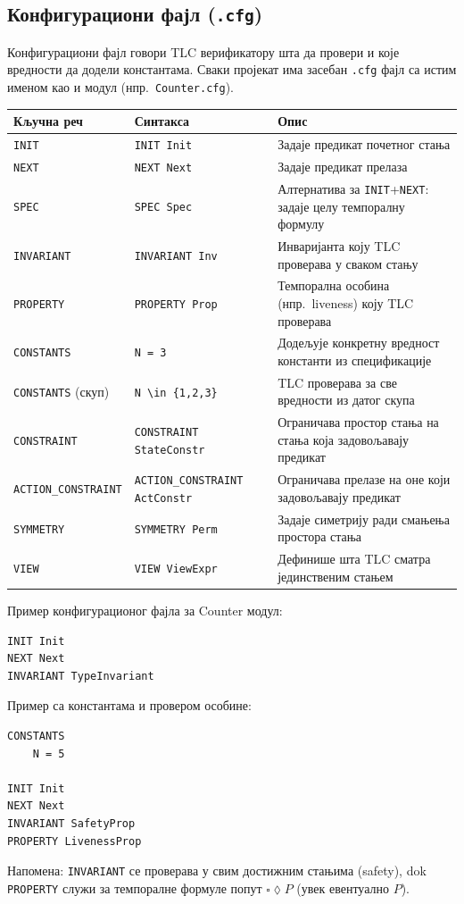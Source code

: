 \subsection{Конфигурациони фајл (\texttt{.cfg})}
Конфигурациони фајл говори TLC верификатору шта да провери и које вредности да додели константама.
Сваки пројекат има засебан \texttt{.cfg} фајл са истим именом као и модул (нпр.\ \texttt{Counter.cfg}).
\begin{center}
\begin{tabularx}{\textwidth}{|l|l|X|}
\hline
\textbf{Кључна реч} & \textbf{Синтакса} & \textbf{Опис} \\
\hline
\texttt{INIT}              & \texttt{INIT Init}                  & Задаје предикат почетног стања \\
\texttt{NEXT}              & \texttt{NEXT Next}                  & Задаје предикат прелаза \\
\texttt{SPEC}              & \texttt{SPEC Spec}                  & Алтернатива за \texttt{INIT}+\texttt{NEXT}: задаје целу темпоралну формулу \\
\texttt{INVARIANT}         & \texttt{INVARIANT Inv}              & Инваријанта коју TLC проверава у сваком стању \\
\texttt{PROPERTY}          & \texttt{PROPERTY Prop}              & Темпорална особина (нпр.\ liveness) коју TLC проверава \\
\texttt{CONSTANTS}         & \texttt{N = 3}                      & Додељује конкретну вредност константи из спецификације \\
\texttt{CONSTANTS} (скуп)  & \texttt{N \textbackslash in \{1,2,3\}} & TLC проверава за све вредности из датог скупа \\
\texttt{CONSTRAINT}        & \texttt{CONSTRAINT StateConstr}     & Ограничава простор стања на стања која задовољавају предикат \\
\texttt{ACTION\_CONSTRAINT}& \texttt{ACTION\_CONSTRAINT ActConstr} & Ограничава прелазе на оне који задовољавају предикат \\
\texttt{SYMMETRY}          & \texttt{SYMMETRY Perm}              & Задаје симетрију ради смањења простора стања \\
\texttt{VIEW}              & \texttt{VIEW ViewExpr}              & Дефинише шта TLC сматра јединственим стањем \\
\hline
\end{tabularx}
\end{center}

Пример конфигурационог фајла за Counter модул:
\begin{lstlisting}
INIT Init
NEXT Next
INVARIANT TypeInvariant
\end{lstlisting}

Пример са константама и провером особине:
\begin{lstlisting}
CONSTANTS
    N = 5

INIT Init
NEXT Next
INVARIANT SafetyProp
PROPERTY LivenessProp
\end{lstlisting}

Напомена: \texttt{INVARIANT} се проверава у свим достижним стањима (safety), dok \texttt{PROPERTY}
служи за темпоралне формуле попут $\square\lozenge P$ (увек евентуално $P$).

